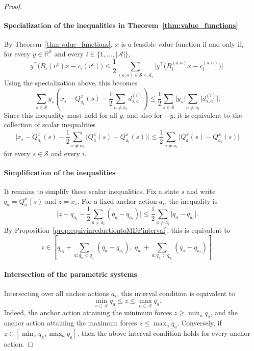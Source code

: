 \documentclass{article}
\theoremstyle{definition}
\theoremstyle{remark}
\begin{document}
\begin{proof}
\paragraph{Specialization of the inequalities in Theorem~\ref{thm:value_functions}} 
By Theorem~\ref{thm:value_functions}, $x$ is a feasible value function if and only if, for every $y\in\mathbb R^{\mathcal S}$ and every $i\in\{1,\ldots,\vert \mathcal A\vert \}$,
\[
    y^\top\bigl(B_i(v^c)x-c_i(v^c)\bigr)
    \le
    \frac12
    \sum_{(o,a)\in\mathcal S\times\mathcal A_i}
    \lvert
        y^\top
        \bigl(B_i^{(o,a)}x-c_i^{(o,a)}\bigr)
    \rvert.
\]
Using the specialization above, this becomes
\[
    \sum_{s\in\mathcal S}
    y_s
    \left(
        x_s-Q_{a_i}^x(s)
        -
        \frac12\sum_{a\neq a_i}d_{s,a}^{(i)}
    \right)
    \le
    \frac12
    \sum_{s\in\mathcal S}
    \vert y_s\vert 
    \sum_{a\neq a_i}
    \vert d_{s,a}^{(i)}\vert .
\]
Since this inequality must hold for all $y$, and also for $-y$, it is equivalent to the collection of scalar inequalities
\[
    \lvert
        x_s-Q_{a_i}^x(s)
        -
        \frac12\sum_{a\neq a_i}
        \bigl(Q_a^x(s)-Q_{a_i}^x(s)\bigr)
    \rvert
    \le
    \frac12\sum_{a\neq a_i}
    \lvert
        Q_a^x(s)-Q_{a_i}^x(s)
    \rvert
\]
for every $s\in\mathcal S$ and every $i$.

\paragraph{Simplification of the inequalities} 
It remains to simplify these scalar inequalities. Fix a state $s$ and write $q_a=Q_a^x(s)$ and $z=x_s$. For a fixed anchor action $a_i$, the inequality is
\[
    \lvert
        z-q_{a_i}
        -
        \frac12\sum_{a\neq a_i}(q_a-q_{a_i})
    \rvert
    \le
    \frac12\sum_{a\neq a_i}\vert q_a-q_{a_i}\vert .
\]
By Proposition~\ref{prop:equivinreductiontoMDPinterval}, this is equivalent to
\[
    z
    \in
    \left[
        q_{a_i}
        +
        \sum_{a:q_a<q_{a_i}}(q_a-q_{a_i}),
        \;
        q_{a_i}
        +
        \sum_{a:q_a>q_{a_i}}(q_a-q_{a_i})
    \right].
\]


\paragraph{Intersection of the parametric systems}  
Intersecting over all anchor actions $a_i$, this interval condition is equivalent to
\[
    \min_{a\in\mathcal A}q_a
    \le z\le
    \max_{a\in\mathcal A}q_a.
\]
Indeed, the anchor action attaining the minimum forces $z\ge \min_a q_a$, and the anchor action attaining the maximum forces $z\le \max_a q_a$. Conversely, if $z\in[\min_a q_a,\max_a q_a]$, then the above interval condition holds for every anchor action.


\end{proof}
\end{document}
